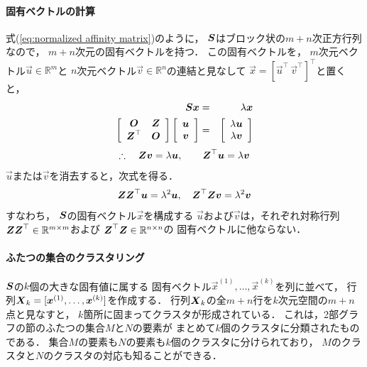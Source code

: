 \paragraph{固有ベクトルの計算}
式(\ref{eq:normalized affinity matrix})のように，
$\mtr S$はブロック状の$m+n$次正方行列なので，
$m+n$次元の固有ベクトルを持つ．
この固有ベクトルを，
$m$次元ベクトル$\vec u\in\mathbb{R}^m$と
$n$次元ベクトル$\vec v\in\mathbb{R}^n$の連結と見なして
$\vec x=[\vec u^\top\,\vec v^\top]^\top$と置くと，
\begin{eqnarray*}
 \mtr S\vec x&=&\lambda\vec x\\
\bmatrix{cc}{\mtr O & \mtr Z\\ \mtr Z^\top & \mtr O}
\bmatrix{c}{\vec u\\ \vec v}
&=&
\bmatrix{c}{\lambda\vec u\\ \lambda\vec v}
\end{eqnarray*}
\begin{equation}
\therefore\quad
\mtr Z\vec v=\lambda\vec u,\qquad
\mtr Z^\top\vec u=\lambda\vec v
\label{eq:two eigen}
\end{equation}
$\vec u$または$\vec v$を消去すると，次式を得る．
\begin{equation}
 \mtr Z\mtr Z^\top\vec u=\lambda^2\vec u,\quad
\mtr Z^\top\mtr Z\vec v=\lambda^2\vec v
\label{eq:uv}
\end{equation}
すなわち，
$\mtr S$の固有ベクトル$\vec x$を構成する
$\vec u$および$\vec v$は，それぞれ対称行列
$\mtr Z\mtr Z^\top\in\mathbb{R}^{m\times m}$および
$\mtr Z^\top\mtr Z\in\mathbb{R}^{n\times n}$の
固有ベクトルに他ならない．



\paragraph{ふたつの集合のクラスタリング}

$\mtr S$の$k$個の大きな固有値に属する
固有ベクトル$\vec x^{(1)},\dots,\vec x^{(k)}$を列に並べて，
行列$\mtr X_k=[\vec x^{(1)},\dots,\vec x^{(k)}]$を作成する．
行列$\mtr X_k$の全$m+n$行を$k$次元空間の$m+n$点と見なすと，
$k$箇所に固まってクラスタが形成されている．
これは，2部グラフの節のふたつの集合$M$と$N$の要素が
まとめて$k$個のクラスタに分類されたものである．
集合$M$の要素も$N$の要素も$k$個のクラスタに分けられており，
$M$のクラスタと$N$のクラスタの対応も知ることができる．


